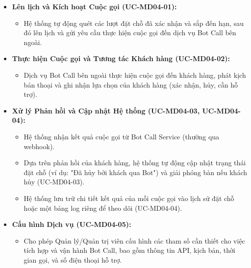 \begin{itemize}
    \item \textbf{Lên lịch và Kích hoạt Cuộc gọi (UC-MD04-01):}
    \begin{itemize}
        \item Hệ thống tự động quét các lượt đặt chỗ đã xác nhận và sắp đến hạn, sau đó lên lịch và gửi yêu cầu thực hiện cuộc gọi đến dịch vụ Bot Call bên ngoài.
    \end{itemize}

    \item \textbf{Thực hiện Cuộc gọi và Tương tác Khách hàng (UC-MD04-02):}
    \begin{itemize}
        \item Dịch vụ Bot Call bên ngoài thực hiện cuộc gọi đến khách hàng, phát kịch bản thoại và ghi nhận lựa chọn của khách hàng (xác nhận, hủy, cần hỗ trợ).
    \end{itemize}

    \item \textbf{Xử lý Phản hồi và Cập nhật Hệ thống (UC-MD04-03, UC-MD04-04):}
    \begin{itemize}
        \item Hệ thống nhận kết quả cuộc gọi từ Bot Call Service (thường qua webhook).
        \item Dựa trên phản hồi của khách hàng, hệ thống tự động cập nhật trạng thái đặt chỗ (ví dụ: "Đã hủy bởi khách qua Bot") và giải phóng bàn nếu khách hủy (UC-MD04-03).
        \item Hệ thống lưu trữ chi tiết kết quả của mỗi cuộc gọi vào lịch sử đặt chỗ hoặc một bảng log riêng để theo dõi (UC-MD04-04).
    \end{itemize}

    \item \textbf{Cấu hình Dịch vụ (UC-MD04-05):}
    \begin{itemize}
        \item Cho phép Quản lý/Quản trị viên cấu hình các tham số cần thiết cho việc tích hợp và vận hành Bot Call, bao gồm thông tin API, kịch bản, thời gian gọi, và số điện thoại hỗ trợ.
    \end{itemize}
\end{itemize}

